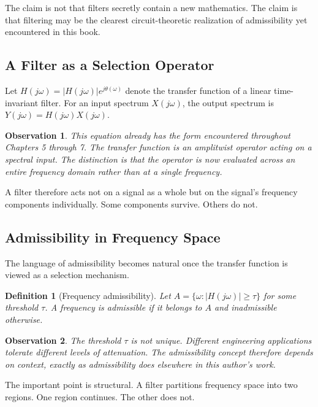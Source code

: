 \documentclass[12pt]{article}
\newtheorem{definition}{Definition}
\newtheorem{observation}{Observation}
\begin{document}
The claim is not that filters secretly contain a new mathematics. The claim is that filtering may be the clearest circuit-theoretic realization of admissibility yet encountered in this book.

\subsection{A Filter as a Selection Operator}

Let $H(j\omega)=|H(j\omega)|e^{j\theta(\omega)}$ denote the transfer function of a linear time-invariant filter. For an input spectrum $X(j\omega)$, the output spectrum is $Y(j\omega)=H(j\omega)X(j\omega)$.

\begin{observation}
This equation already has the form encountered throughout Chapters 5 through 7. The transfer function is an amplitwist operator acting on a spectral input. The distinction is that the operator is now evaluated across an entire frequency domain rather than at a single frequency.
\end{observation}

A filter therefore acts not on a signal as a whole but on the signal's frequency components individually. Some components survive. Others do not.

\subsection{Admissibility in Frequency Space}

The language of admissibility becomes natural once the transfer function is viewed as a selection mechanism.

\begin{definition}[Frequency admissibility]
Let $A=\{\omega : |H(j\omega)| \ge \tau\}$ for some threshold $\tau$. A frequency is admissible if it belongs to $A$ and inadmissible otherwise.
\end{definition}

\begin{observation}
The threshold $\tau$ is not unique. Different engineering applications tolerate different levels of attenuation. The admissibility concept therefore depends on context, exactly as admissibility does elsewhere in this author's work.
\end{observation}

The important point is structural. A filter partitions frequency space into two regions. One region continues. The other does not.
\end{document}
